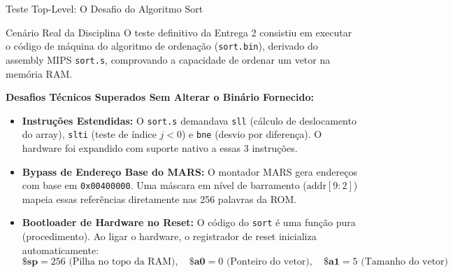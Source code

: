 \documentclass[aspectratio=169, 11pt]{beamer}
\begin{document}
\begin{frame}{Teste Top-Level: O Desafio do Algoritmo Sort}
  \begin{block}{Cenário Real da Disciplina}
    O teste definitivo da Entrega 2 consistiu em executar o código de máquina do algoritmo de ordenação (\texttt{sort.bin}), derivado do assembly MIPS \texttt{sort.s}, comprovando a capacidade de ordenar um vetor na memória RAM.
  \end{block}

  \vspace{0.3cm}
  \textbf{Desafios Técnicos Superados Sem Alterar o Binário Fornecido:}
  \begin{itemize}\setlength{\itemsep}{6pt}
    \item \textbf{Instruções Estendidas:} O \texttt{sort.s} demandava \texttt{sll} (cálculo de deslocamento do array), \texttt{slti} (teste de índice $j < 0$) e \texttt{bne} (desvio por diferença). O hardware foi expandido com suporte nativo a essas 3 instruções.
    \item \textbf{Bypass de Endereço Base do MARS:} O montador MARS gera endereços com base em \texttt{0x00400000}. Uma máscara em nível de barramento ($\text{addr}[9:2]$) mapeia essas referências diretamente nas 256 palavras da ROM.
    \item \textbf{Bootloader de Hardware no Reset:} O código do \texttt{sort} é uma função pura (procedimento). Ao ligar o hardware, o registrador de reset inicializa automaticamente:
      $$\mathbf{\$sp} = 256 \text{ (Pilha no topo da RAM)}, \quad \mathbf{\$a0} = 0 \text{ (Ponteiro do vetor)}, \quad \mathbf{\$a1} = 5 \text{ (Tamanho do vetor)}$$
  \end{itemize}
\end{frame}
\end{document}
